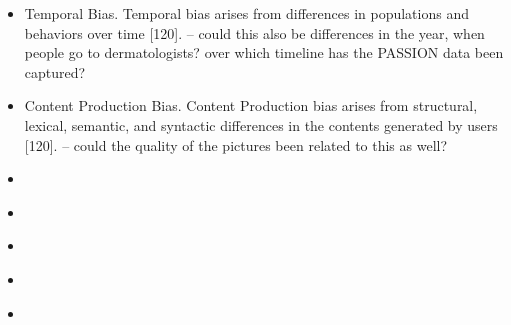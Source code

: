 \documentclass[12pt, a4paper, oneside]{book}   	%
\begin{document}
\begin{itemize}
				\item Temporal Bias. Temporal bias arises from differences in populations and behaviors over time [120]. \autocite{Mehrabi_2021} -- could this also be differences in the year, when people go to dermatologists? over which timeline has the PASSION data been captured? 
				\item Content Production Bias. Content Production bias arises from structural, lexical, semantic, and syntactic differences in the contents generated by users [120]. \autocite{Mehrabi_2021} -- could the quality of the pictures been related to this as well?
				\item \autocite{Mehrabi_2021}
				\item \autocite{Mehrabi_2021}
				\item \autocite{Mehrabi_2021}
				\item \autocite{Mehrabi_2021}
				\item \autocite{Mehrabi_2021}
			\end{itemize}
			
\end{document}
